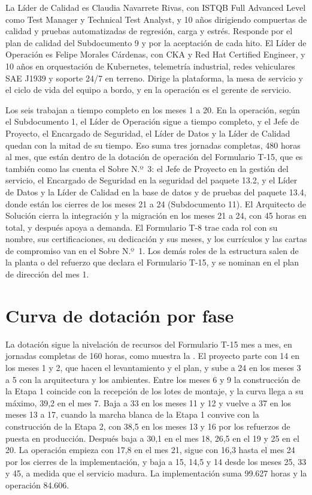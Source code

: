 La Líder de Calidad es Claudia Navarrete Rivas, con ISTQB Full Advanced Level como Test Manager y
Technical Test Analyst, y 10 años dirigiendo compuertas de calidad y pruebas automatizadas de regresión,
carga y estrés. Responde por el plan de calidad del Subdocumento 9 y por la aceptación de cada hito. El
Líder de Operación es Felipe Morales Cárdenas, con CKA y Red Hat Certified Engineer, y 10 años en
orquestación de Kubernetes, telemetría industrial, redes vehiculares SAE J1939 y soporte 24/7 en
terreno. Dirige la plataforma, la mesa de servicio y el ciclo de vida del equipo a bordo, y en la
operación es el gerente de servicio.

Los seis trabajan a tiempo completo en los meses 1 a 20. En la operación, según el Subdocumento 1, el
Líder de Operación sigue a tiempo completo, y el Jefe de Proyecto, el Encargado de Seguridad, el Líder
de Datos y la Líder de Calidad quedan con la mitad de su tiempo. Eso suma tres jornadas completas, 480
horas al mes, que están dentro de la dotación de operación del Formulario T-15, que es también como las
cuenta el Sobre N.º~3: el Jefe de Proyecto en la gestión del servicio, el Encargado de Seguridad en la
seguridad del paquete 13.2, y el Líder de Datos y la Líder de Calidad en la base de datos y de pruebas
del paquete 13.4, donde están los cierres de los meses 21 a 24 (Subdocumento 11). El Arquitecto de
Solución cierra la integración y la migración en los meses 21 a 24, con 45 horas en total, y después
apoya a demanda. El Formulario T-8 trae cada rol con su nombre, sus certificaciones, su
dedicación y sus meses, y los currículos y las cartas de compromiso van en el Sobre N.º~1. Los demás
roles de la estructura salen de la planta o del refuerzo que declara el Formulario T-15, y se nominan en
el plan de dirección del mes 1.

\section{Curva de dotación por fase}\label{sec:12-curva-de-dotacion-por-fase}

La dotación sigue la nivelación de recursos del Formulario T-15 mes a mes, en jornadas completas de 160
horas, como muestra la . El proyecto parte con 14 en los meses 1 y 2, que hacen el
levantamiento y el plan, y sube a 24 en los meses 3 a 5 con la arquitectura y los ambientes. Entre los
meses 6 y 9 la construcción de la Etapa 1 coincide con la recepción de los lotes de montaje, y la curva
llega a su máximo, 39,2 en el mes 7. Baja a 33 en los meses 11 y 12 y vuelve a 37 en los meses 13 a 17,
cuando la marcha blanca de la Etapa 1 convive con la construcción de la Etapa 2, con 38,5 en los meses 13
y 16 por los refuerzos de puesta en producción. Después baja a 30,1 en el mes 18, 26,5 en el 19 y 25 en
el 20. La operación empieza con 17,8 en el mes 21, sigue con 16,3 hasta el mes 24 por los cierres de la
implementación, y baja a 15, 14,5 y 14 desde los meses 25, 33 y 45, a medida que el servicio madura. La
implementación suma 99.627 horas y la operación 84.606.

